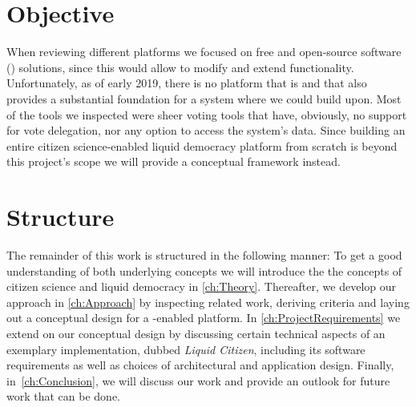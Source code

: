 \section{Objective}
\label{sec:Objective}

When reviewing different platforms we focused on free and open-source software () solutions, since this would allow to modify and extend functionality. Unfortunately, as of early 2019, there is no platform that is  and that also provides a substantial foundation for a  system where we could build upon. Most of the tools we inspected were sheer voting tools that have, obviously, no support for vote delegation, nor any option to access the system’s data. Since building an entire citizen science-enabled liquid democracy platform from scratch is beyond this project’s scope we will provide a conceptual framework instead. 






\section{Structure}
\label{sec:structure}
The remainder of this work is structured in the following manner:
To get a good understanding of both underlying concepts we will introduce the the concepts of citizen science and liquid democracy in \autoref{ch:Theory}.
Thereafter, we develop our approach in \autoref{ch:Approach} by inspecting related work, deriving criteria and laying out a conceptual design for a -enabled  platform.
In \autoref{ch:ProjectRequirements} we extend on our conceptual design by discussing certain technical aspects of an exemplary implementation, dubbed \emph{Liquid Citizen}, including its software requirements as well as choices of architectural and application design.
Finally, in~\autoref{ch:Conclusion}, we will discuss our work and provide an outlook for future work that can be done. 
